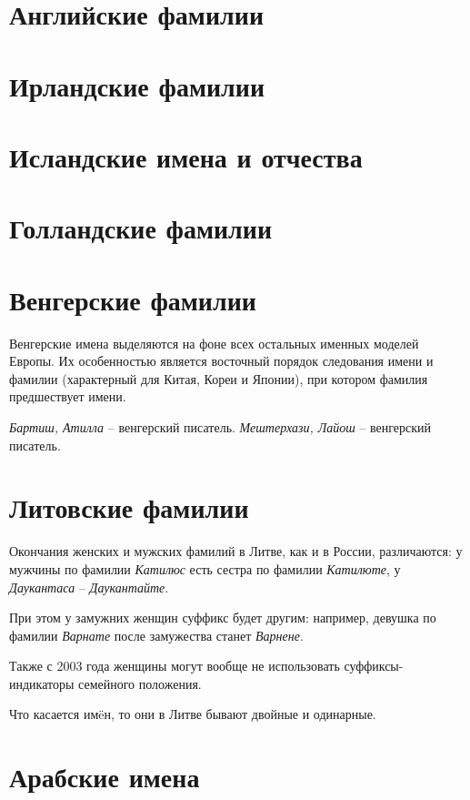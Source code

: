 \section{Английские фамилии}

\section{Ирландские фамилии}

\section{Исландские имена и отчества}

\section{Голландские фамилии}

\section{Венгерские фамилии}

Венгерские имена выделяются на фоне всех остальных именных моделей Европы. Их особенностью является восточный порядок следования имени и фамилии (характерный для Китая, Кореи и Японии), при котором фамилия предшествует имени. 

\emph{Бартиш, Атилла} -- венгерский писатель.
\emph{Мештерхази, Лайош} -- венгерский писатель.

\section{Литовские фамилии}

Окончания женских и мужских фамилий в Литве, как и в России, различаются: у мужчины по фамилии \emph{Катилюс} есть сестра по фамилии \emph{Катилюте}, у \emph{Даукантаса} -- \emph{Даукантайте}.

При этом у замужних женщин суффикс будет другим: например, девушка по фамилии \emph{Варнате} после замужества станет \emph{Варнене}.

Также с 2003 года женщины могут вообще не использовать суффиксы-индикаторы семейного положения.

Что касается им\"eн, то они в Литве бывают двойные и одинарные.

\section{Арабские имена}

